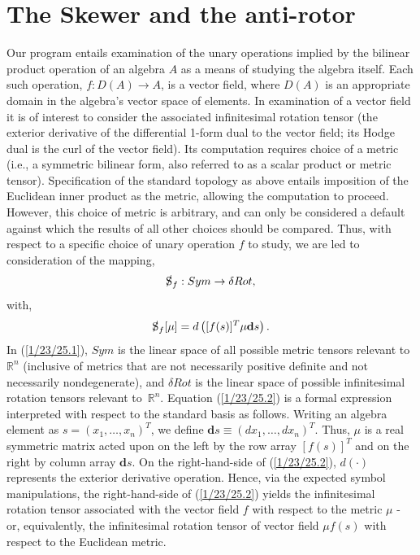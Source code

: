 \documentclass{amsart}
\numberwithin{equation}{section}
\theoremstyle{definition}
\numberwithin{theorem}{section}
\begin{document}
\section{The Skewer and the anti-rotor} 
Our program entails examination of the unary operations implied by the bilinear product operation of an algebra $A$ as a means of studying the algebra itself.
Each such operation, $f:D(A)\rightarrow A$, is a vector field, where $D(A)$ is an appropriate domain in the algebra's vector space of elements.  In examination of a vector field it is of interest to consider the associated infinitesimal rotation tensor (the exterior derivative of the differential 1-form dual to the vector field; its Hodge dual is the curl of the vector field).  Its computation requires choice of a metric (i.e., a symmetric bilinear form, also referred to as a scalar product or metric tensor).  Specification of the standard topology as above entails imposition of the Euclidean inner product as the metric, allowing the computation to proceed.  However, this choice of metric is arbitrary, and can only be considered a default against which the results of all other choices should be compared.  Thus, with respect to a specific choice of unary operation $f$ to study, we are led to consideration of the mapping, \begin{equation}\label{1/23/25.1} \slashed{\text{S}}_f: Sym \rightarrow \delta Rot,\end{equation}  
with, \begin{equation}\label{1/23/25.2} \slashed{\text{S}}_f[\mu] = d\left([f(s)]^T \mu \mathbf{d}s\right).  \end{equation}
 In (\ref{1/23/25.1}), $Sym$ is the linear space of all possible metric tensors relevant to $\mathbb{R}^n$ (inclusive of metrics that are not necessarily positive definite and not necessarily nondegenerate), and $\delta Rot$ is the linear space of possible infinitesimal rotation tensors relevant \mbox{to $\mathbb{R}^n$}.  Equation (\ref{1/23/25.2}) is a formal expression interpreted with respect to the standard basis as follows.  Writing an algebra element as $s=(x_1,\dots,x_n)^T$, we define $\mathbf{d}s \equiv (dx_1,\dots,dx_n)^T$. Thus, $\mu$ is a real symmetric matrix acted upon on the left by the row array $[f(s)]^T$ and on the right by column array $\mathbf{d}s$.  On the right-hand-side of (\ref{1/23/25.2}), $d(\cdot)$ represents the exterior derivative operation.  Hence, via the expected symbol manipulations, the right-hand-side of (\ref{1/23/25.2}) yields the infinitesimal rotation tensor associated with the vector field $f$ with respect to the metric $\mu$ - or, equivalently, the infinitesimal rotation tensor of vector field $\mu f(s)$ with respect to the Euclidean metric.
\end{document}
